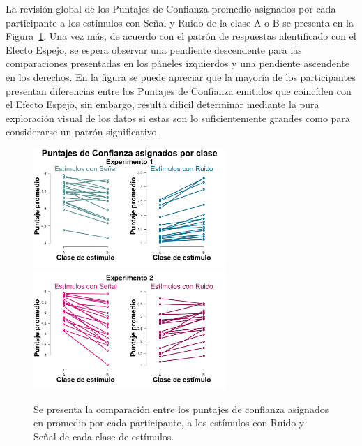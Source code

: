 La revisión global de los Puntajes de Confianza promedio asignados por cada participante a los estímulos con Señal y Ruido de la clase A o B se presenta en la Figura~\ref{fig:Diff_Ratings}. Una vez más, de acuerdo con el patrón de respuestas identificado con el Efecto Espejo, se espera observar una pendiente descendente para las comparaciones presentadas en los páneles izquierdos y una pendiente ascendente en los derechos. En la figura se puede apreciar que la mayoría de los participantes presentan diferencias entre los Puntajes de Confianza emitidos que coincíden con el Efecto Espejo, sin embargo, resulta difícil determinar mediante la pura exploración visual de los datos si estas son lo suficientemente grandes como para considerarse un patrón significativo.\\

\begin{figure}[th]
\centering
\includegraphics[width=0.65\textwidth]{Figures/Diff_Rating_E1}\\ 
\includegraphics[width=0.65\textwidth]{Figures/Diff_Rating_E2}\\
\decoRule
\caption[Comparación entre los Puntajes de Confianza asignados a los ensayos con Ruido y Señal de cada clase]{Se presenta la comparación entre los puntajes de confianza asignados en promedio por cada participante, a los estímulos con Ruido y Señal de cada clase de estímulos.}
\label{fig:Diff_Ratings}
\end{figure}

